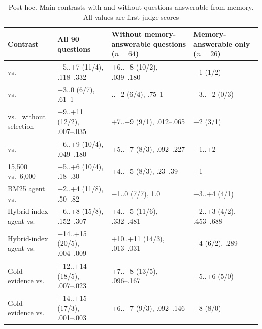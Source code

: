 \begin{table}[tp]
\caption{Post hoc. Main contrasts with and without questions answerable from memory. All values are first-judge scores}
\label{tab:contam}
\centering
\footnotesize
\setlength{\tabcolsep}{3.5pt}
\begin{tabularx}{\textwidth}{@{}>{\raggedright\arraybackslash}X>{\centering\arraybackslash}X>{\centering\arraybackslash}X>{\centering\arraybackslash}X@{}}
\toprule
Contrast & All 90 questions & Without memory-answerable questions ($n=64$) & Memory-answerable only ($n=26$) \\
\midrule
\lexb{} vs.\ \hybrid{} & +5..+7 (11/4), .118--.332 & +6..+8 (10/2), .039--.180 & $-$1 (1/2) \\
\lexb{} vs.\ \hr{} & $-$3..0 (6/7), .61--1 & 0..+2 (6/4), .75--1 & $-$3..$-$2 (0/3) \\
\lexb{} vs.\ \lexb{} without selection & +9..+11 (12/2), .007--.035 & +7..+9 (9/1), .012--.065 & +2 (3/1) \\
\hr{} vs.\ \hybrid{} & +6..+9 (10/4), .049--.180 & +5..+7 (8/3), .092--.227 & +1..+2 \\
\hybrid{} 15,500 vs.\ 6,000 & +5..+6 (10/4), .18--.30 & +4..+5 (8/3), .23--.39 & +1 \\
BM25 agent vs.\ \hr{} & +2..+4 (11/8), .50--.82 & $-$1..0 (7/7), 1.0 & +3..+4 (4/1) \\
Hybrid-index agent vs.\ \hr{} & +6..+8 (15/8), .152--.307 & +4..+5 (11/6), .332--.481 & +2..+3 (4/2), .453--.688 \\
Hybrid-index agent vs.\ \hybrid{} & +14..+15 (20/5), .004--.009 & +10..+11 (14/3), .013--.031 & +4 (6/2), .289 \\
Gold evidence vs.\ \hr{} & +12..+14 (18/5), .007--.023 & +7..+8 (13/5), .096--.167 & +5..+6 (5/0) \\
Gold evidence vs.\ \lexb{} & +14..+15 (17/3), .001--.003 & +6..+7 (9/3), .092--.146 & +8 (8/0) \\
\bottomrule
\end{tabularx}
\end{table}
